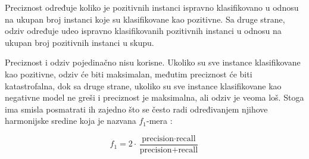 \noindent Preciznost određuje koliko je pozitivnih instanci ispravno klasifikovano u odnosu na ukupan broj instanci koje su klasifikovane kao pozitivne. Sa druge strane, odziv određuje udeo ispravno klasifikovanih pozitivnih instanci u odnosu na ukupan broj pozitivnih instanci u skupu. 

Preciznost i odziv pojedinačno nisu korisne. Ukoliko su sve instance klasifikovane kao pozitivne, odziv će biti maksimalan, međutim preciznost će biti katastrofalna, dok sa druge strane, ukoliko su sve instance klasifikovane kao negativne model ne greši i preciznost je maksimalna, ali odziv je veoma loš. Stoga ima smisla posmatrati ih zajedno što se često radi određivanjem njihove harmonijske sredine koja je nazvana $f_1$-mera \cite{ml}:

$$f_1 = 2 \cdot \dfrac{\text{precision} \cdot \text{recall}}{\text{precision} + \text{recall}}$$



